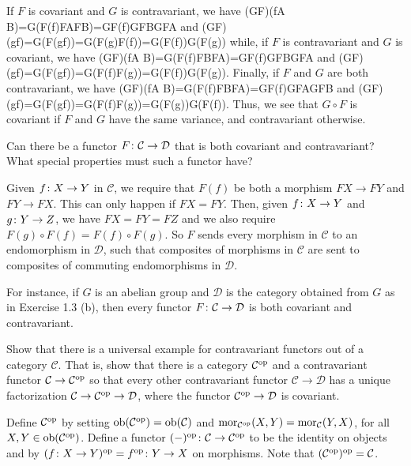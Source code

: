 If $F$ is covariant and $G$ is contravariant, we have
\bse
(G\circ F)(f\cl A \to B)=G(F(f)\cl FA\to FB)=GF(f)\cl GFB\to GFA
\ese
and
\bse
(G\circ F)(g\circ f)=G(F(g\circ f))=G(F(g)\circ F(f))=G(F(f))\circ G(F(g))
\ese
while, if $F$ is contravariant and $G$ is covariant, we have
\bse
(G\circ F)(f\cl A \to B)=G(F(f)\cl FB\to FA)=GF(f)\cl GFB\to GFA
\ese
and
\bse
(G\circ F)(g\circ f)=G(F(g\circ f))=G(F(f)\circ F(g))=G(F(f))\circ G(F(g)).
\ese
Finally, if $F$ and $G$ are both contravariant, we have
\bse
(G\circ F)(f\cl A \to B)=G(F(f)\cl FB\to FA)=GF(f)\cl GFA\to GFB
\ese
and
\bse
(G\circ F)(g\circ f)=G(F(g\circ f))=G(F(f)\circ F(g))=G(F(g))\circ G(F(f)).
\ese
Thus, we see that $G\circ F$ is covariant if $F$ and $G$ have the same variance, and contravariant otherwise.
\es

\bx
Can there be a functor $F \colon \mathcal{C} \to \mathcal{D}$ that is both covariant and contravariant? What special properties must such a functor have?
\ex

\bs
Given $f\colon X\to Y$ in $\mathcal{C}$, we require that $F(f)$ be both a morphism $FX\to FY$ and $FY\to FX$. This can only happen if $FX=FY$. Then, given $f\colon X\to Y$ and $g\colon Y\to Z$, we have $FX=FY=FZ$ and we also require $F(g)\circ F(f)=F(f)\circ F(g)$. So $F$ sends every morphism in $\mathcal{C}$ to an endomorphism in $\mathcal{D}$, such that composites of morphisms in $\mathcal{C}$ are sent to composites of commuting endomorphisms in $\mathcal{D}$.

For instance, if $G$ is an abelian group and $\mathcal{D}$ is the category obtained from $G$ as in Exercise 1.3 (b), then every functor $F\colon \mathcal{C}\to \mathcal{D}$ is both covariant and contravariant.
\es

\bx
Show that there is a universal example for contravariant functors out of a category $\mathcal{C}$. That is, show that there is a category $\mathcal{C}^{\mathrm{op}}$ and a contravariant functor $\mathcal{C} \to \mathcal{C}^{\mathrm{op}}$ so that every other contravariant functor $\mathcal{C} \to \mathcal{D}$ has a unique factorization $\mathcal{C} \to \mathcal{C}^{\mathrm{op}} \to \mathcal{D}$, where the functor $\mathcal{C}^{\mathrm{op}} \to\mathcal{D}$ is covariant.
\ex

\bs
Define $\mathcal{C}^{\mathrm{op}}$ by setting $\operatorname{ob}(\mathcal{C}^{\mathrm{op}})=\operatorname{ob}(\mathcal{C})$ and $\operatorname{mor}_{\mathcal{C}^{\mathrm{op}}}(X,Y)=\operatorname{mor}_{\mathcal{C}}(Y,X)$, for all $X,Y\in\operatorname{ob}(\mathcal{C}^{\mathrm{op}})$. Define a functor $(-)^{\mathrm{op}}\colon \mathcal{C}\to \mathcal{C}^{\mathrm{op}}$ to be the identity on objects and by $(f\colon X\to Y)^{\mathrm{op}}=f^{\mathrm{op}}\colon Y\to X$ on morphisms. Note that $(\mathcal{C}^{\mathrm{op}})^{\mathrm{op}}=\mathcal{C}$.

